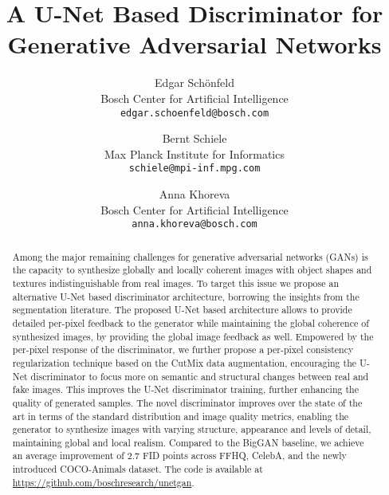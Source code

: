 \documentclass[10pt,twocolumn,letterpaper]{article}
\begin{document}
\title{\vspace{-3em}A U-Net Based Discriminator for Generative Adversarial Networks}
\author{Edgar Sch{\"o}nfeld\\
	Bosch Center for Artificial Intelligence\\
	\texttt{edgar.schoenfeld@bosch.com} \\
	\and
	Bernt Schiele\\
	Max Planck Institute for Informatics\\
	\texttt{schiele@mpi-inf.mpg.com} 
	\and
	Anna Khoreva \\
	Bosch Center for Artificial Intelligence\\
	\texttt{anna.khoreva@bosch.com} \\
}

\maketitle

\begin{abstract}
\vspace{-1.0em}
Among the major remaining challenges for generative adversarial networks (GANs) is the capacity to synthesize globally and locally coherent images with object shapes and textures indistinguishable from real images. To target this issue we propose an alternative U-Net based discriminator architecture, borrowing the insights from the segmentation literature. The proposed U-Net based architecture allows to provide detailed per-pixel feedback to the generator while maintaining the global coherence of synthesized images, by providing the global image feedback as well.
Empowered by the per-pixel response of the discriminator,
we further propose a per-pixel consistency regularization technique based on the CutMix data augmentation, encouraging the U-Net discriminator to focus more on
semantic and structural changes between real and fake images.
This improves the U-Net discriminator training, further enhancing the quality of generated samples.
The novel discriminator improves over the state of the art in terms of the standard distribution and image quality metrics, enabling the generator to synthesize images with varying structure, appearance and levels of detail, maintaining global and local realism. 
Compared to the BigGAN baseline, we achieve an average improvement of $2.7$ FID points across FFHQ, CelebA, and the newly introduced COCO-Animals dataset. The code is available at \url{https://github.com/boschresearch/unetgan}.











\end{abstract}
\end{document}
